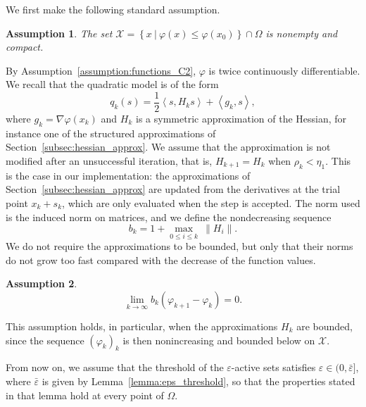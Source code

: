\documentclass[pdflatex,sn-mathphys-num]{sn-jnl}%
\theoremstyle{thmstyleone}%
\newtheorem{assumption}{Assumption}
\newcommand{\calX}{{\mathcal{X}}}
\newcommand{\inner}[2]{\left\langle {#1} , {#2} \right\rangle} %
\newcommand{\rev}[1]{#1}
\begin{document}
We first make the following standard assumption.
\begin{assumption}\label{assumption:inner_iterates_compact}
	The set $\calX = \left\{x \ | \ \varphi(x) \le \varphi(x_0)\right\} \cap \Omega$ is nonempty and compact.
\end{assumption}
By Assumption~\ref{assumption:functions_C2}, $\varphi$ is twice continuously differentiable. We recall that the quadratic model is of the form
\[q_k(s) = \dfrac{1}{2} \inner{s}{H_ks} + \inner{g_k}{s},\]
where $g_k = \nabla \varphi(x_k)$ and $H_k$ is a symmetric approximation of the Hessian, for instance one of the structured approximations of Section~\ref{subsec:hessian_approx}. \rev{We assume that the approximation is not modified after an unsuccessful iteration, that is, $H_{k+1} = H_k$ when $\rho_k < \eta_1$. This is the case in our implementation: the approximations of Section~\ref{subsec:hessian_approx} are updated from the derivatives at the trial point $x_k+s_k$, which are only evaluated when the step is accepted.} The norm used is the induced norm on matrices, and we define the nondecreasing sequence
\[b_k = 1+\max_{0 \le i \le k} \ \left\| H_i\right\|.\]
We do not require the approximations to be bounded, but only that their norms do not grow too fast compared with the decrease of the function values.
\begin{assumption}\label{assumption:hessian_norm_compared_convergence_speed}
	\[\lim\limits_{k\to \infty} b_k (\varphi_{k+1}-\varphi_k) = 0.\]
\end{assumption}
This assumption holds, in particular, when the approximations $H_k$ are bounded, since the sequence $(\varphi_k)_k$ is then nonincreasing and bounded below on $\calX$.

From now on, we assume that the threshold of the $\varepsilon$-active sets satisfies $\varepsilon \in (0,\bar\varepsilon]$, where $\bar\varepsilon$ is given by Lemma~\ref{lemma:eps_threshold}, so that the properties stated in that lemma hold at every point of $\Omega$.
\end{document}
